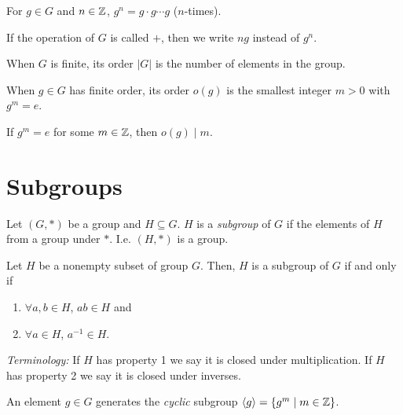 \begin{notation}
	For $g \in G$ and $n \in {\mathbb{Z}}$, $g^n = g \cdot g \cdots g$ ($n$-times).
\end{notation}

\begin{notation}
	If the operation of $G$ is called $+$, then we write $ng$ instead of $g^n$.
\end{notation}

\begin{notation}
	When $G$ is finite, its order $|G|$ is the number of elements in the group.
\end{notation}

\begin{notation}
	When $g \in G$ has finite order, its order $o(g)$ is the smallest integer $m >
	0$ with $g^m = e$.
\end{notation}

\begin{notation}
	If $g^m = e$ for some $m \in {\mathbb{Z}}$, then $o(g) \mid m$.
\end{notation}

\section*{Subgroups}

\begin{definition}
	Let $(G, *)$ be a group and $H \subseteq G$. $H$ is a \emph{subgroup} of $G$
	if the elements of $H$ from a group under $*$. I.e. $(H, *)$ is a group.
\end{definition}

\begin{theorem}
	Let $H$ be a nonempty subset of group $G$. Then, $H$ is a subgroup of $G$ if
	and only if
	\begin{enumerate}
		\item $\forall a,b \in H$, $ab \in H$ and
		\item $\forall a \in H$, $a^{-1} \in H$.
	\end{enumerate}
	\emph{Terminology:} If $H$ has property 1 we say it is closed under
	multiplication. If $H$ has property 2 we say it is closed under inverses.
\end{theorem}

\begin{definition}
	An element $g \in G$ generates the \emph{cyclic} subgroup $\langle g
	\rangle = \{g^m \mid m \in {\mathbb{Z}}\}$.
\end{definition}

